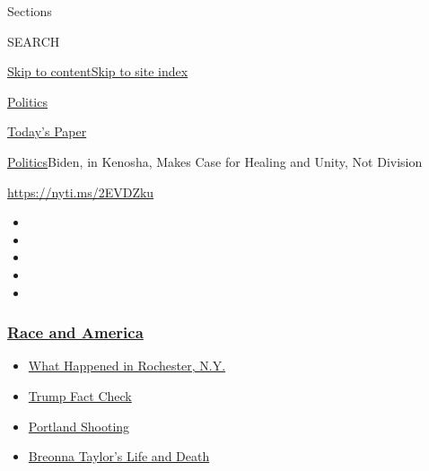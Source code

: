 Sections

SEARCH

\protect\hyperlink{site-content}{Skip to
content}\protect\hyperlink{site-index}{Skip to site index}

\href{https://www.nytimes3xbfgragh.onion/section/politics}{Politics}

\href{https://myaccount.nytimes3xbfgragh.onion/auth/login?response_type=cookie\&client_id=vi}{}

\href{https://www.nytimes3xbfgragh.onion/section/todayspaper}{Today's
Paper}

\href{/section/politics}{Politics}\textbar{}Biden, in Kenosha, Makes
Case for Healing and Unity, Not Division

\url{https://nyti.ms/2EVDZku}

\begin{itemize}
\item
\item
\item
\item
\item
\end{itemize}

\hypertarget{race-and-america}{%
\subsubsection{\texorpdfstring{\href{https://www.nytimes3xbfgragh.onion/news-event/george-floyd-protests-minneapolis-new-york-los-angeles?name=styln-george-floyd\&region=TOP_BANNER\&block=storyline_menu_recirc\&action=click\&pgtype=Article\&impression_id=95f0ec40-f2b8-11ea-8b9b-bf5f32135118\&variant=undefined}{Race
and America}}{Race and America}}\label{race-and-america}}

\begin{itemize}
\tightlist
\item
  \href{https://www.nytimes3xbfgragh.onion/2020/09/04/nyregion/rochester-police-daniel-prude.html?name=styln-george-floyd\&region=TOP_BANNER\&block=storyline_menu_recirc\&action=click\&pgtype=Article\&impression_id=95f0ec41-f2b8-11ea-8b9b-bf5f32135118\&variant=undefined}{What
  Happened in Rochester, N.Y.}
\item
  \href{https://www.nytimes3xbfgragh.onion/2020/09/01/us/politics/trump-fact-check-protests.html?name=styln-george-floyd\&region=TOP_BANNER\&block=storyline_menu_recirc\&action=click\&pgtype=Article\&impression_id=95f0ec42-f2b8-11ea-8b9b-bf5f32135118\&variant=undefined}{Trump
  Fact Check}
\item
  \href{https://www.nytimes3xbfgragh.onion/2020/08/30/us/portland-shooting-explained.html?name=styln-george-floyd\&region=TOP_BANNER\&block=storyline_menu_recirc\&action=click\&pgtype=Article\&impression_id=95f0ec43-f2b8-11ea-8b9b-bf5f32135118\&variant=undefined}{Portland
  Shooting}
\item
  \href{https://www.nytimes3xbfgragh.onion/2020/08/30/us/breonna-taylor-police-killing.html?name=styln-george-floyd\&region=TOP_BANNER\&block=storyline_menu_recirc\&action=click\&pgtype=Article\&impression_id=95f0ec44-f2b8-11ea-8b9b-bf5f32135118\&variant=undefined}{Breonna
  Taylor's Life and Death}
\end{itemize}

